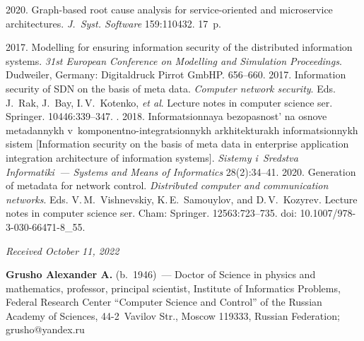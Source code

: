 \begin{multicols}{2}
{{\begin{thebibliography}{99}
 2020. Graph-based root cause analysis for service-oriented and 
microservice architectures. \textit{J.~Syst. Software} 159:110432. 17~p. 

 2017. Modelling for 
ensuring information security of the distributed information systems. \textit{31st 
European Conference on Modelling and Simulation Proceedings}. Dudweiler, 
Germany: Digitaldruck Pirrot GmbHP. 656--660.
 2017. 
Information security of SDN on the basis of meta data. \textit{Computer network security}. Eds. 
J.~Rak, J.~Bay, I.\,V.~Kotenko, \textit{et al}. Lecture notes in computer science ser. Springer. 
10446:339--347.
. 2018.
Informatsionnaya bezopasnost' na osnove metadannykh  
v~komponentno-integratsionnykh arkhitekturakh informatsionnykh sistem [Information 
security on the basis of meta data in enterprise application integration architecture of 
information systems]. \textit{Sistemy i~Sredstva Informatiki~--- Systems and Means of 
Informatics} 28(2):34--41.
 2020. Generation of 
metadata for network control. \textit{Distributed computer and communication 
networks}. Eds. V.\,M.~Vishnevskiy, K.\,E.~Samouylov, and D.\,V.~Kozyrev. Lecture 
notes in computer science ser. Cham: Springer. 12563:723--735. 
doi: 10.1007/978-3-030-66471-8\_55. 
\end{thebibliography}

 }
 }

\end{multicols}

\vspace*{-6pt}

\hfill{\small\textit{Received October 11, 2022}}

\Contr


\noindent
\textbf{Grusho Alexander A.} (b.\ 1946)~--- Doctor of Science in physics and 
mathematics, professor, principal scientist, Institute of Informatics Problems, Federal 
Research Center ``Computer Science and Control'' of the Russian Academy of Sciences, 
44-2~Vavilov Str., Moscow 119333, Russian Federation; \mbox{grusho@yandex.ru}

